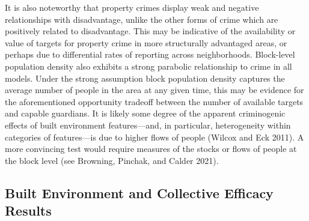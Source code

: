 \documentclass [11pt, proquest] {uwthesis}[2015/03/03]
\begin{document}
\begin{longtable}[c]{|p{0.10in}|p{0.80in}|p{0.75in}|p{0.75in}|p{0.75in}|p{0.75in}|p{0.75in}}
Roman}\textbf{(}}}\fontsize{10}{10}\selectfont{\textcolor[HTML]{000000}{\global\setmainfont{Latin Modern Roman}\textbf{0.03}}}\fontsize{10}{10}\selectfont{\textcolor[HTML]{000000}{\global\setmainfont{Latin Modern Roman}\textbf{)}}}} & \multicolumn{1}{!{\color[HTML]{000000}\vrule width 0pt}>{\centering}p{\dimexpr 0.75in+0\tabcolsep+0\arrayrulewidth}!{\color[HTML]{000000}\vrule width 0pt}}{\fontsize{10}{10}\selectfont{\textcolor[HTML]{000000}{\global\setmainfont{Latin Modern Roman}\textbf{-0.05}}}\fontsize{10}{10}\selectfont{\textcolor[HTML]{000000}{\global\setmainfont{Latin Modern Roman}\textbf{\linebreak }}}\fontsize{10}{10}\selectfont{\textcolor[HTML]{000000}{\global\setmainfont{Latin Modern Roman}\textbf{(}}}\fontsize{10}{10}\selectfont{\textcolor[HTML]{000000}{\global\setmainfont{Latin Modern Roman}\textbf{0.02}}}\fontsize{10}{10}\selectfont{\textcolor[HTML]{000000}{\global\setmainfont{Latin Modern Roman}\textbf{)}}}} \\

\noalign{\global\setlength{\arrayrulewidth}{0.5pt}}\arrayrulecolor[HTML]{000000}\cline{1-7}

\end{longtable}
It is also noteworthy that property crimes display weak and negative relationships with disadvantage, unlike the other forms of crime which are positively related to disadvantage. This may be indicative of the availability or value of targets for property crime in more structurally advantaged areas, or perhaps due to differential rates of reporting across neighborhoods. Block-level population density also exhibits a strong parabolic relationship to crime in all models. Under the strong assumption block population density captures the average number of people in the area at any given time, this may be evidence for the aforementioned opportunity tradeoff between the number of available targets and capable guardians. It is likely some degree of the apparent criminogenic effects of built environment features---and, in particular, heterogeneity within categories of features---is due to higher flows of people (Wilcox and Eck 2011). A more convincing test would require measures of the stocks or flows of people at the block level (see Browning, Pinchak, and Calder 2021).

\hypertarget{built-environment-and-collective-efficacy-results}{%
\subsection{Built Environment and Collective Efficacy Results}\label{built-environment-and-collective-efficacy-results}}
\end{document}
